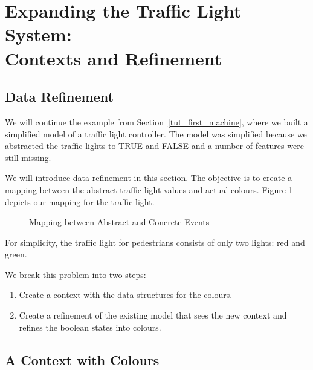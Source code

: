 \section[Contexts and Refinement]{Expanding the Traffic Light System:\\ Contexts and Refinement}
\label{tut_expanding_traffic_light_system}


\subsection{Data Refinement}
\label{tut_data_refinement}

We will continue the example from Section~\ref{tut_first_machine}, where we built a simplified model of a traffic light controller.  The model was simplified because we abstracted the traffic lights to TRUE and FALSE and a number of features were still missing.

We will introduce data refinement in this section.  The objective is to create a mapping between the abstract traffic light values and actual colours. Figure \ref{fig_tut_07_tl_colours} depicts our mapping for the traffic light.

\begin{figure}[!ht]
\begin{center}
	\caption{Mapping between Abstract and Concrete Events}
	\label{fig_tut_07_tl_colours}
\end{center}
\end{figure}

For simplicity, the traffic light for pedestrians consists of only two lights: red and green.

We break this problem into two steps:

\begin{enumerate}
	\item Create a context with the data structures for the colours.
	\item Create a refinement of the existing model that sees the new context and refines the boolean states into colours.
\end{enumerate}

\subsection{A Context with Colours}
\label{tut_context_with_colors}


